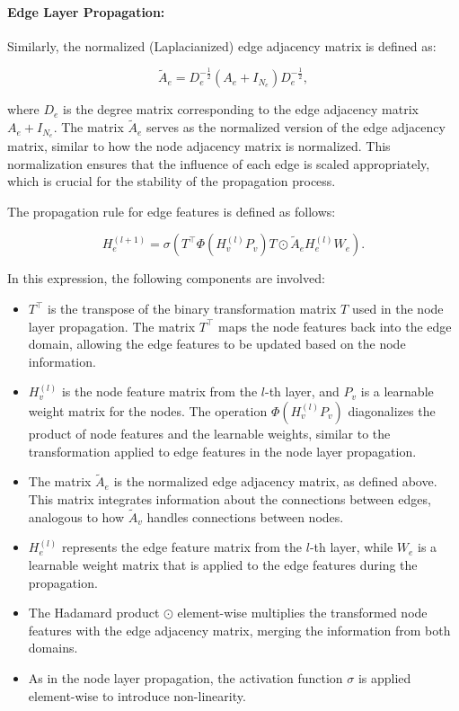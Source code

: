 \paragraph{Edge Layer Propagation:}

Similarly, the normalized (Laplacianized) edge adjacency matrix is defined as:

\begin{equation}
\tilde{A}_e = D_e^{-\frac{1}{2}} \left(A_e + I_{N_e}\right) D_e^{-\frac{1}{2}},
\end{equation}

where \( D_e \) is the degree matrix corresponding to the edge adjacency matrix \( A_e + I_{N_e} \). The matrix \( \tilde{A}_e \) serves as the normalized version of the edge adjacency matrix, similar to how the node adjacency matrix is normalized. This normalization ensures that the influence of each edge is scaled appropriately, which is crucial for the stability of the propagation process.

The propagation rule for edge features is defined as follows:

\begin{equation}
H^{(l+1)}_e = \sigma\left(T^\top \Phi\left(H^{(l)}_v P_v\right) T \odot \tilde{A}_e H^{(l)}_e W_e\right).
\end{equation}

In this expression, the following components are involved:

\begin{itemize}
    \item \textbf{ \( T^\top \)} is the transpose of the binary transformation matrix \( T \) used in the node layer propagation. The matrix \( T^\top \) maps the node features back into the edge domain, allowing the edge features to be updated based on the node information.
    \item \( H^{(l)}_v \) is the node feature matrix from the \( l \)-th layer, and \( P_v \) is a learnable weight matrix for the nodes. The operation \( \Phi(H^{(l)}_v P_v) \) diagonalizes the product of node features and the learnable weights, similar to the transformation applied to edge features in the node layer propagation. 
    \item The matrix \( \tilde{A}_e \) is the normalized edge adjacency matrix, as defined above. This matrix integrates information about the connections between edges, analogous to how \( \tilde{A}_v \) handles connections between nodes. 
    \item \( H^{(l)}_e \) represents the edge feature matrix from the \( l \)-th layer, while \( W_e \) is a learnable weight matrix that is applied to the edge features during the propagation.
    \item The Hadamard product \( \odot \) element-wise multiplies the transformed node features with the edge adjacency matrix, merging the information from both domains.
    \item As in the node layer propagation, the activation function \( \sigma \) is applied element-wise to introduce non-linearity.

\end{itemize}

